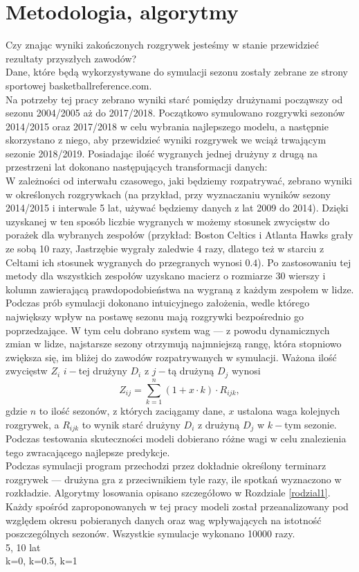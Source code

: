 \documentclass[inzynierska]{pwr_wmat_praca_dyplomowa}
\theoremstyle{plain}
\numberwithin{theorem}{chapter}
\theoremstyle{definition}
\numberwithin{theorem}{chapter}
\begin{document}
 
\chapter{Metodologia, algorytmy}\label{rodzial_algorytmy}
Czy znając wyniki zakończonych rozgrywek jesteśmy w stanie przewidzieć rezultaty przyszłych zawodów?
\\
Dane, które będą wykorzystywane do symulacji sezonu zostały zebrane ze strony sportowej basketballreference.com.
\\
Na potrzeby tej pracy zebrano wyniki starć pomiędzy drużynami począwszy od sezonu 2004/2005 aż do 2017/2018. Początkowo symulowano rozgrywki sezonów 2014/2015 oraz 2017/2018 w celu wybrania najlepszego modelu, a następnie skorzystano z niego, aby przewidzieć wyniki rozgrywek we wciąż trwającym sezonie 2018/2019.
Posiadając ilość wygranych jednej drużyny z drugą na przestrzeni lat dokonano następujących transformacji danych:
\\
W zależności od interwału czasowego, jaki będziemy rozpatrywać, zebrano wyniki w określonych rozgrywkach (na przykład, przy wyznaczaniu wyników sezony 2014/2015 i interwale 5 lat, używać będziemy danych z lat 2009 do 2014). Dzięki uzyskanej w ten sposób liczbie wygranych w możemy stosunek zwycięstw do porażek dla wybranych zespołów (przykład: Boston Celtics i Atlanta Hawks grały ze sobą 10 razy, Jastrzębie wygrały zaledwie 4 razy, dlatego też w starciu z Celtami ich stosunek wygranych do przegranych wynosi $0.4$). Po zastosowaniu tej metody dla wszystkich zespołów uzyskano macierz o rozmiarze 30 wierszy i kolumn zawierającą prawdopodobieństwa na wygraną z każdym zespołem w lidze.
\\
Podczas prób symulacji dokonano intuicyjnego założenia, wedle którego największy wpływ na postawę sezonu mają rozgrywki bezpośrednio go poprzedzające. W tym celu dobrano system wag --- z powodu dynamicznych zmian w lidze, najstarsze sezony otrzymują najmniejszą rangę, która stopniowo zwiększa się, im bliżej do zawodów rozpatrywanych w symulacji. Ważona ilość zwycięstw $Z_i$ $i-$tej drużyny $D_i$ z $j-$tą drużyną $D_j$ wynosi
\begin{equation}
	Z_{ij} = \sum_{k=1}^{n} (1+x\cdot k)\cdot R_{ijk}, 
\end{equation}
gdzie $n$ to ilość sezonów, z których zaciągamy dane, $x$ ustalona waga kolejnych rozgrywek, a $R_{ijk}$ to wynik starć drużyny $D_i$ z drużyną $D_j$ w $k-$tym sezonie. Podczas testowania skuteczności modeli dobierano różne wagi w celu znalezienia tego zwracającego najlepsze predykcje.    
\\
Podczas symulacji program przechodzi przez dokładnie określony terminarz rozgrywek --- drużyna gra z przeciwnikiem tyle razy, ile spotkań wyznaczono w rozkładzie. Algorytmy losowania opisano szczegółowo w Rozdziale \ref{rodzial1}.
\\
Każdy spośród zaproponowanych w tej pracy modeli został przeanalizowany pod względem okresu pobieranych danych oraz wag wpływających na istotność poszczególnych sezonów. Wszystkie symulacje wykonano 10000 razy.
\\
5, 10 lat
\\
k=0, k=0.5, k=1
\end{document}
